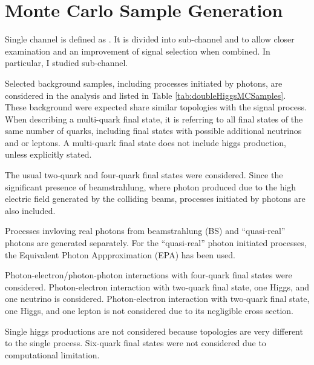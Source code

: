 \section{Monte Carlo Sample Generation}


Single channel is defined as \eeToHH. It is divided into sub-channel \eeToHHbbWW and \eeToHHbbbb to allow closer examination and an improvement of signal selection when combined. In particular, I studied \eeToHHbbWW sub-channel.

Selected background samples, including processes initiated by photons, are considered in the analysis and listed in Table \ref{tab:doubleHiggsMCSamples}. These background were expected share similar topologies with the signal process. When describing a multi-quark final state, it is referring to  all final states of the same number of quarks, including final states with possible additional neutrinos and or leptons. A multi-quark final state does not include higgs production, unless explicitly stated.

The usual two-quark and four-quark final states were considered.
Since the significant presence of beamstrahlung, where photon produced due to the high electric field generated by the colliding beams, processes initiated by photons are also included.

Processes invloving real photons from beamstrahlung (BS) and ``quasi-real'' photons are generated separately. For the ``quasi-real'' photon initiated processes, the Equivalent Photon Appproximation (EPA) has been used.

Photon-electron/photon-photon interactions with four-quark final states were considered. Photon-electron interaction with two-quark final state, one Higgs, and one neutrino is considered. Photon-electron interaction with two-quark final state, one Higgs, and one lepton is not considered due to its negligible cross section.


Single higgs productions are not considered because topologies are very different to the single process.
Six-quark final states were not considered due to computational limitation.

